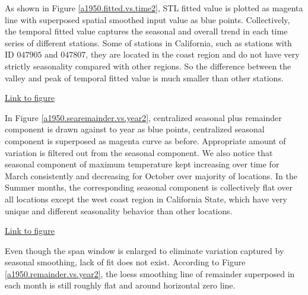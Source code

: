As shown in Figure
\href{../plots/a1950/stlplus/t241td1_s41sd1_ffd/a1950.stlraw.vs.time.pdf}
{\ref*{a1950.fitted.vs.time2}}, STL fitted value is plotted as magenta line with 
superposed spatial smoothed input value as blue points. Collectively, the temporal
fitted value captures the seasonal and overall trend in each time series of 
different stations. Some of stations in California, such as stations with ID 
$047905$ and $047807$, they are located in the coast region and do not have very
strictly seasonality compared with other regions. So the difference between the
valley and peak of temporal fitted value is much smaller than other stations.

\begin{framed}
\begin{center}
  \href{../plots/a1950/stlplus/t241td1_s41sd1_ffd/a1950.searemainder.vs.year.pdf}
  {Link to figure}
  \label{a1950.searemainder.vs.year2}
\end{center}
\end{framed}

In Figure 
\href{../plots/a1950/stlplus/t241td1_s41sd1_ffd/a1950.searemainder.vs.year.pdf}
{\ref*{a1950.searemainder.vs.year2}}, centralized seasonal plus remainder 
component is drawn against to year as blue points, centralized seasonal component
is superposed as magenta curve as before. Appropriate amount of variation is 
filtered out from the seasonal component. We also notice that seasonal component
of maximum temperature kept increasing over time for March consistently and 
decreasing for October over majority of locations. In the Summer months, the 
corresponding seasonal component is collectively flat over all locations except 
the west coast region in California State, which have very unique and different
seasonality behavior than other locations.

\begin{framed}
\begin{center}
  \href{../plots/a1950/stlplus/t241td1_s41sd1_ffd/a1950.remainder.vs.year.pdf}
  {Link to figure}
  \label{a1950.remainder.vs.year2}
\end{center}
\end{framed}

Even though the span window is enlarged to eliminate variation captured by 
seasonal smoothing, lack of fit does not exist. According to Figure 
\href{../plots/a1950/stlplus/t241td1_s41sd1_ffd/a1950.remainder.vs.year.pdf}
{\ref*{a1950.remainder.vs.year2}}, the loess smoothing line of remainder
superposed in each month is still roughly flat and around horizontal zero line.

